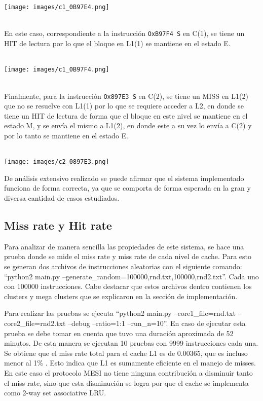 \documentclass {article}
\begin{document}
\\
\\
\begin{centering} \texttt{[image: images/c1\_0B97E4.png]} \end{centering}
\\
En este caso, correspondiente a la instrucción \texttt{OxB97F4 S} en C(1), se tiene un HIT de
lectura por lo que el bloque en L1(1) se mantiene en el estado E.
\\
\\
\begin{centering} \texttt{[image: images/c1\_0B97F4.png]} \end{centering}
\\
Finalmente, para la instrucción \texttt{Ox897E3 S} en C(2), se tiene un MISS en L1(2) que no se
resuelve con L1(1) por lo que se requiere acceder a L2, en donde se tiene un HIT de lectura de forma
que el bloque en este nivel se mantiene en el estado M, y se envía el mismo a L1(2), en donde este a
su vez lo envía a C(2) y por lo tanto se mantiene en el estado E.
\\
\\
\begin{centering} \texttt{[image: images/c2\_0897E3.png]} \end{centering}


De análisis extensivo realizado se puede afirmar que el sistema implementado funciona de forma
correcta, ya que se comporta de forma esperada en la gran y diversa cantidad de casos estudiados.

\subsection{Miss rate y Hit rate}

Para analizar de manera sencilla las propiedades de este sistema, se hace una prueba donde se mide
el miss rate y miss rate de cada nivel de cache. Para esto se generan dos archivos de instrucciones
aleatorias con el siguiente comando: ``python2 main.py
--generate\_random=100000,rnd.txt,100000,rnd2.txt''. Cada uno con 100000 instrucciones. Cabe destacar
que estos archivos dentro contienen los clusters y mega clusters que se explicaron en la sección de
implementación. 


Para realizar las pruebas se ejecuta ``python2 main.py --core1\_file=rnd.txt --core2\_file=rnd2.txt
--debug --ratio=1:1 --run\_n=10''. En caso de ejecutar esta prueba se debe tomar en cuenta que tuvo
una duración aproximada de 52 minutos. De esta manera se ejecutan 10 pruebas con 9999 instrucciones cada
una. Se obtiene que el miss rate total para el cache L1 es de 0.00365, que es incluso menor al 1\%
. Esto indica que L1 es sumamente eficiente en el manejo de misses. En este caso el protocolo MESI
no tiene ninguna contribución a disminuir tanto el miss rate, sino que esta disminución se logra por
que el cache se implementa como 2-way set associative LRU. 
\end{document}
